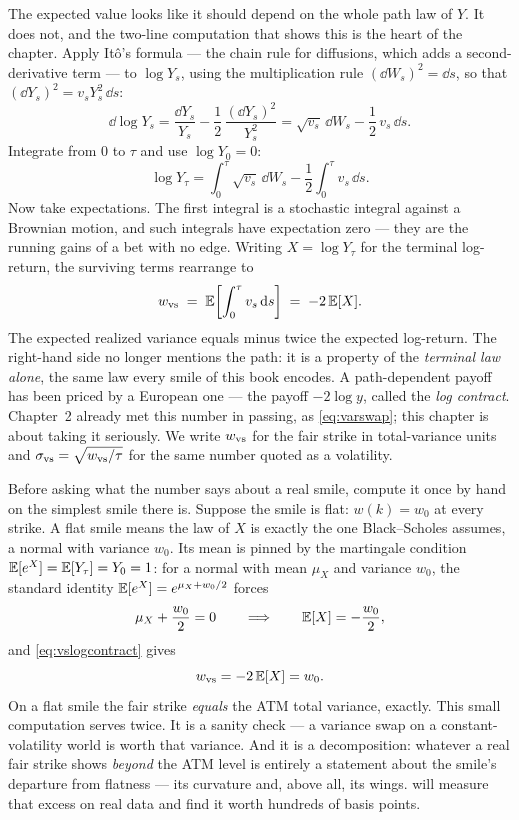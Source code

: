 The expected value looks like it should depend on the whole path law
of $Y$.  It does not, and the two-line computation that shows this is
the heart of the chapter.  Apply It\^o's formula --- the chain rule
for diffusions, which adds a second-derivative term --- to $\log Y_s$,
using the multiplication rule $(\dd W_s)^2=\dd s$, so that
$(\dd Y_s)^2=v_s Y_s^2\,\dd s$:
\begin{equation}
\dd \log Y_s=\frac{\dd Y_s}{Y_s}
-\frac12\,\frac{(\dd Y_s)^2}{Y_s^2}
=\sqrt{v_s}\,\dd W_s-\frac12\,v_s\,\dd s .
\label{eq:vsito}
\end{equation}
Integrate from $0$ to $\tau$ and use $\log Y_0=0$:
\[
\log Y_\tau=\int_0^{\tau}\sqrt{v_s}\,\dd W_s
-\frac12\int_0^{\tau}v_s\,\dd s .
\]
Now take expectations.  The first integral is a stochastic integral
against a Brownian motion, and such integrals have expectation zero ---
they are the running gains of a bet with no edge.  Writing
$X=\log Y_\tau$ for the terminal log-return, the surviving terms
rearrange to
\begin{equation}
w_{\rm vs}
\;=\;\mathbb{E}\!\left[\int_0^{\tau}v_s\,\mathrm{d} s\right]
\;=\;-2\,\mathbb{E}[X].
\label{eq:vslogcontract}
\end{equation}
The expected realized variance equals minus twice the expected
log-return.  The right-hand side no longer mentions the path: it is a
property of the \emph{terminal law alone}, the same law every smile of
this book encodes.  A path-dependent payoff has been priced by a
European one --- the payoff $-2\log y$, called the \emph{log
contract}.  Chapter~2 already met this number in passing, as
\eqref{eq:varswap}; this chapter is about taking it seriously.  We
write $w_{\rm vs}$ for the fair strike in total-variance units and
$\sigma_{\rm vs}=\sqrt{w_{\rm vs}/\tau}$ for the same number quoted as
a volatility.

Before asking what the number says about a real smile, compute it once
by hand on the simplest smile there is.  Suppose the smile is flat:
$w(k)=w_0$ at every strike.  A flat smile means the law of $X$ is
exactly the one Black--Scholes assumes, a normal with variance $w_0$.
Its mean is pinned by the martingale condition
$\mathbb{E}[e^X]=\mathbb{E}[Y_\tau]=Y_0=1$: for a normal with mean $\mu_X$ and
variance $w_0$, the standard identity
$\mathbb{E}[e^X]=e^{\mu_X+w_0/2}$ forces
\[
\mu_X+\frac{w_0}{2}=0
\qquad\Longrightarrow\qquad
\mathbb{E}[X]=-\frac{w_0}{2},
\]
and \eqref{eq:vslogcontract} gives
\begin{equation}
w_{\rm vs}=-2\,\mathbb{E}[X]=w_0 .
\label{eq:vsflat}
\end{equation}
On a flat smile the fair strike \emph{equals} the ATM total variance,
exactly.  This small computation serves twice.  It is a
sanity check --- a variance swap on a constant-volatility world is
worth that variance.  And it is a decomposition: whatever a real fair
strike shows \emph{beyond} the ATM level is entirely a statement about
the smile's departure from flatness --- its curvature and, above all,
its wings.   will measure that excess on real data
and find it worth hundreds of basis points.

